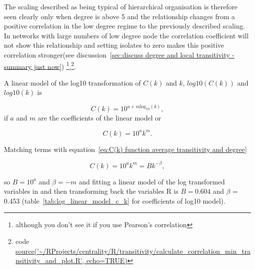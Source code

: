 The scaling described as being typical of hierarchical organisation is therefore seen clearly only when degree is above 5 and the relationship changes from a positive correlation in the low degree regime to the previously described scaling. In networks with large numbers of low degree node the correlation coefficient will not show this relationship and setting isolates to zero makes this positive correlation stronger(see discussion~\ref{sec:discuss degree and local transitivity - summary just now}) \footnote{although you don't see it if you use Pearson's correlation},\footnote{code \url{source('~/RProjects/centrality/R/transitivity/calculate_correlation_min_transitivity_and_plot.R', echo=TRUE)}}.



A linear model of the log10 transformation of $C(k)$ and $k$, $log10(C(k))$ and $log10(k)$ is

\begin{equation}
C(k) = 10^{a + m \textrm{log}_{10}(k)},
\end{equation}
if $a$ and $m$ are the coefficients of the linear model or

\begin{equation}
    C(k) = 10^a k^m.
\end{equation}

Matching terms with equation~\ref{eq:C(k) function average transitivity and degree}

\begin{equation}
    C(k) = 10^a k^m = B k^{-\beta},
\end{equation}

so $B=10^a$ and $\beta=-m$ and fitting a linear model of the log transformed variables in and then transforming back the variables R is $B=0.604$ and $\beta$ = 0.453 (table~\ref{tab:log_linear_model_c_k} for coefficients of log10 model).


